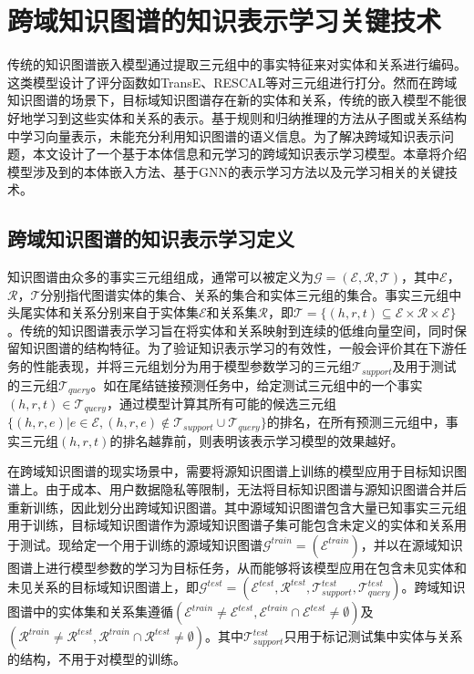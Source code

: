 \chapter{跨域知识图谱的知识表示学习关键技术}
传统的知识图谱嵌入模型通过提取三元组中的事实特征来对实体和关系进行编码。这类模型设计了评分函数如TransE、RESCAL等对三元组进行打分。然而在跨域知识图谱的场景下，目标域知识图谱存在新的实体和关系，传统的嵌入模型不能很好地学习到这些实体和关系的表示。基于规则和归纳推理的方法从子图或关系结构中学习向量表示，未能充分利用知识图谱的语义信息。为了解决跨域知识表示问题，本文设计了一个基于本体信息和元学习的跨域知识表示学习模型。本章将介绍模型涉及到的本体嵌入方法、基于GNN的表示学习方法以及元学习相关的关键技术。

\section{跨域知识图谱的知识表示学习定义}
知识图谱由众多的事实三元组组成，通常可以被定义为\(\mathcal{G} = (\mathcal{E},\mathcal{R},\mathcal{T})\)，其中\(\mathcal{E}\)，\(\mathcal{R}\)，\(\mathcal{T}\)分别指代图谱实体的集合、关系的集合和实体三元组的集合。事实三元组中头尾实体和关系分别来自于实体集\(\mathcal{E}\)和关系集\(\mathcal{R}\)，即\(\mathcal{T}=\{(h,r,t) \subseteq \mathcal{E} \times \mathcal{R} \times \mathcal{E}\}\)。传统的知识图谱表示学习旨在将实体和关系映射到连续的低维向量空间，同时保留知识图谱的结构特征。为了验证知识表示学习的有效性，一般会评价其在下游任务的性能表现，并将三元组划分为用于模型参数学习的三元组\(\mathcal{T}_{support}\)及用于测试的三元组\(\mathcal{T}_{query}\)。如在尾结链接预测任务中，给定测试三元组中的一个事实\((h,r,t) \in \mathcal{T}_{query}\)，通过模型计算其所有可能的候选三元组\(\{(h,r,e) | e \in \mathcal{E}, (h,r,e) \notin \mathcal{T}_{support} \cup \mathcal{T}_{query}\}\)的排名，在所有预测三元组中，事实三元组\((h,r,t)\)的排名越靠前，则表明该表示学习模型的效果越好。

在跨域知识图谱的现实场景中，需要将源知识图谱上训练的模型应用于目标知识图谱上。由于成本、用户数据隐私等限制，无法将目标知识图谱与源知识图谱合并后重新训练，因此划分出跨域知识图谱。其中\(\textbf{源域知识图谱}\)包含大量已知事实三元组用于训练，\(\textbf{目标域知识图谱}\)作为源域知识图谱子集可能包含未定义的实体和关系用于测试。现给定一个用于训练的源域知识图谱\(\mathcal{G}^{train} = (\mathcal{E}^{train})\)，并以在源域知识图谱上进行模型参数的学习为目标任务，从而能够将该模型应用在包含未见实体和未见关系的目标域知识图谱上，即\(\mathcal{G}^{test} = (\mathcal{E}^{test},\mathcal{R}^{test},\mathcal{T}^{test}_{support},\mathcal{T}^{test}_{query})\)。跨域知识图谱中的实体集和关系集遵循\((\mathcal{E}^{train} \neq \mathcal{E}^{test},\mathcal{E}^{train} \cap \mathcal{E}^{test} \neq \emptyset)\)及\((\mathcal{R}^{train} \neq \mathcal{R}^{test},\mathcal{R}^{train} \cap \mathcal{R}^{test} \neq \emptyset)\)。其中\(\mathcal{T}^{test}_{support}\)只用于标记测试集中实体与关系的结构，不用于对模型的训练。
